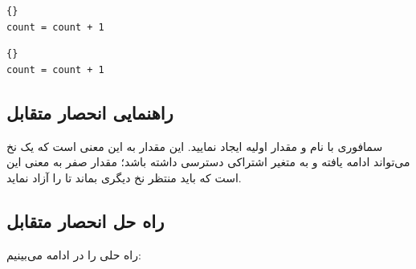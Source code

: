 \documentclass{book}
\newcommand{\clearemptydoublepage}{\newpage\cleardoublepage}
\begin{document}
\begin{latin}
\begin{minipage}[t]{2in}
\begin{latin}
\begin{lstlisting}[title=\rl{نخ \lr{A}}]{}
count = count + 1
\end{lstlisting}
\end{latin}
\end{minipage}
\hfill
\begin{minipage}[t]{2in}
\begin{latin}
\begin{lstlisting}[title=\rl{نخ \lr{B}}]{}
count = count + 1
\end{lstlisting}
\end{latin}
\end{minipage}
\end{latin}

\clearemptydoublepage
\subsection{راهنمایی انحصار متقابل}

    سمافوری با نام  و مقدار اولیه  ایجاد نمایید. 
    این مقدار به این معنی است که یک نخ می‌تواند ادامه یافته و به متغیر اشتراکی دسترسی داشته باشد؛ مقدار صفر به معنی این است که 
    باید منتظر نخ دیگری بماند تا  را آزاد نماید. 


\clearemptydoublepage
\subsection{  راه حل انحصار متقابل}

    راه حلی را در ادامه می‌بینیم:
\end{document}
